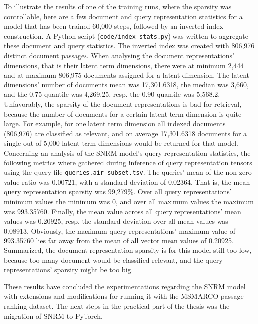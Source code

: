 To illustrate the results of one of the training runs, where the sparsity was controllable, 
    here are a few document and query representation statistics for a model that has been 
    trained 60,000 steps, followed by an inverted index construction.
A Python script (\texttt{code/index\_stats.py}) was written to aggregate these document and
    query statistics.
The inverted index was created with 806,976 distinct document passages.
When analysing the document representations' dimensions, that is their latent term dimensions,
    there were at minimum 2,444 and at maximum 806,975 documents assigned for a latent dimension.
The latent dimensions' number of documents mean was 17,301.6318, the median was 3,660, and the
    0.75-quantile was 4,269.25, resp. the 0.90-quantile was 5,568.2.
Unfavorably, the sparsity of the document representations is bad for retrieval, because
    the number of documents for a certain latent term dimension is quite large.
For example, for one latent term dimension all indexed documents (806,976) are classified as relevant,
    and on average 17,301.6318 documents for a single out of 5,000 latent term dimensions
    would be returned for that model.\\
Concerning an analysis of the SNRM model's query representation statistics,
    the following metrics where gathered during inference of query representation tensors
    using the query file \texttt{queries.air-subset.tsv}.
The queries' mean of the non-zero value ratio was 0.00721, with a standard deviation of
    0.02364.
That is, the mean query representation sparsity was 99,279\%.
Over all query representations' minimum values the minimum was 0, and over all
    maximum values the maximum was 993.35760.
Finally, the mean value across all query representations' mean values was 0.20925, 
    resp. the standard deviation over all mean values was 0.08913.
Obviously, the maximum query representations' maximum value of 993.35760 lies far away from the mean of
    all vector mean values of 0.20925.
Summarized, the document representation sparsity is for this model still too low, because 
    too many document would be classified relevant, and the query representations' sparsity might be too big.

These results have concluded the experimentations regarding the SNRM model with extensions and modifications
    for running it with the MSMARCO passage ranking dataset.
The next steps in the practical part of the thesis was the migration of SNRM to PyTorch.


